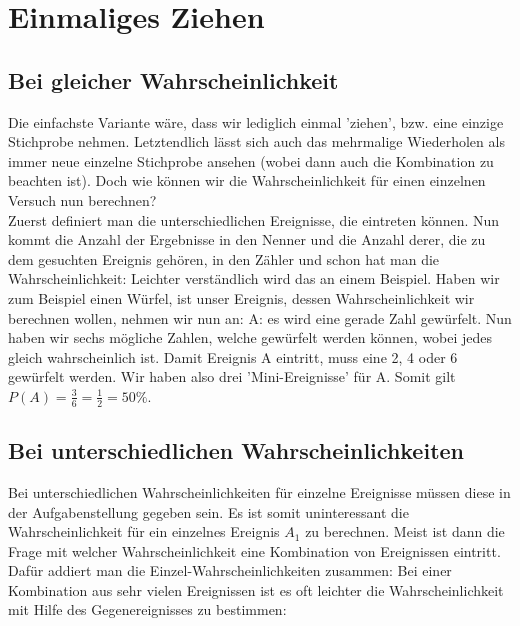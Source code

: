 \section{Einmaliges Ziehen}
	\subsection{Bei gleicher Wahrscheinlichkeit}
		Die einfachste Variante wäre, dass wir lediglich einmal 'ziehen', bzw. eine
		einzige Stichprobe nehmen. Letztendlich lässt sich auch das mehrmalige
		Wiederholen als immer neue einzelne Stichprobe ansehen (wobei dann auch die
		Kombination zu beachten ist). Doch wie können wir die Wahrscheinlichkeit für
		einen einzelnen Versuch nun berechnen?\\
		Zuerst definiert man die unterschiedlichen Ereignisse, die eintreten können.
		Nun kommt die Anzahl der Ergebnisse in den Nenner und die Anzahl derer, die zu
		dem gesuchten Ereignis gehören, in den Zähler und schon hat man die
		Wahrscheinlichkeit:
		\formel{\[P(A)=\frac{Anzahl\ der\ Ereignisse\ von\ A}{Anzahl\ der\ gesamten\
		Ereignisse}=\frac{\#A}{\#\Omega}\]}
		Leichter verständlich wird das an einem	Beispiel. Haben wir zum Beispiel einen
		Würfel, ist unser Ereignis, dessen Wahrscheinlichkeit wir berechnen wollen,
		nehmen wir nun an: A: es wird eine gerade Zahl gewürfelt. Nun haben wir sechs
		mögliche Zahlen, welche gewürfelt werden können, wobei jedes gleich
		wahrscheinlich ist. Damit Ereignis A eintritt, muss eine 2, 4 oder 6 gewürfelt
		werden. Wir haben also drei 'Mini-Ereignisse' für A. Somit gilt
		\(P(A)=\frac{3}{6}=\frac{1}{2}=50\%\).
	
	\subsection{Bei unterschiedlichen Wahrscheinlichkeiten}
		Bei unterschiedlichen Wahrscheinlichkeiten für einzelne Ereignisse müssen
		diese in der Aufgabenstellung gegeben sein. Es ist somit uninteressant die
		Wahrscheinlichkeit für ein einzelnes Ereignis $A_1$ zu berechnen. Meist ist
		dann die Frage mit welcher Wahrscheinlichkeit eine Kombination von Ereignissen
		eintritt. Dafür addiert man die Einzel-Wahrscheinlichkeiten zusammen:
		\formel{\[P(A)=P(A_1)+P(A_2)+\cdots+P(A_n)\]}
		Bei einer Kombination aus sehr vielen Ereignissen ist es oft leichter die
		Wahrscheinlichkeit mit Hilfe des Gegenereignisses zu bestimmen:
		\formel{\[P(A)=1-P(\bar{A})=1-(P(\bar{A}_1)+P(\bar{A}_2)+\cdots+P(\bar{A}_n))\]}
